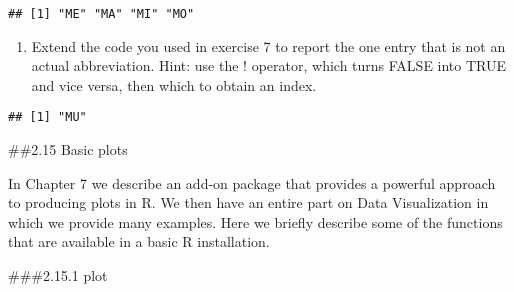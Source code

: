 \documentclass[
]{article}
\newenvironment{Shaded}{\begin{snugshade}}{\end{snugshade}}
\newcommand{\FunctionTok}[1]{\textcolor[rgb]{0.00,0.00,0.00}{#1}}
\newcommand{\NormalTok}[1]{#1}
\newcommand{\OtherTok}[1]{\textcolor[rgb]{0.56,0.35,0.01}{#1}}
\newcommand{\SpecialCharTok}[1]{\textcolor[rgb]{0.00,0.00,0.00}{#1}}
\newcommand{\StringTok}[1]{\textcolor[rgb]{0.31,0.60,0.02}{#1}}
\providecommand{\tightlist}{%
  \setlength{\itemsep}{0pt}\setlength{\parskip}{0pt}}
\begin{document}
\begin{Shaded}
\end{Shaded}

\begin{verbatim}
## [1] "ME" "MA" "MI" "MO"
\end{verbatim}

\begin{enumerate}
\def\labelenumi{\arabic{enumi}.}
\setcounter{enumi}{7}
\tightlist
\item
  Extend the code you used in exercise 7 to report the one entry that is
  not an actual abbreviation. Hint: use the ! operator, which turns
  FALSE into TRUE and vice versa, then which to obtain an index.
\end{enumerate}

\begin{Shaded}
\end{Shaded}

\begin{verbatim}
## [1] "MU"
\end{verbatim}

\#\#2.15 Basic plots

In Chapter 7 we describe an add-on package that provides a powerful
approach to producing plots in R. We then have an entire part on Data
Visualization in which we provide many examples. Here we briefly
describe some of the functions that are available in a basic R
installation.

\#\#\#2.15.1 plot
\end{document}
